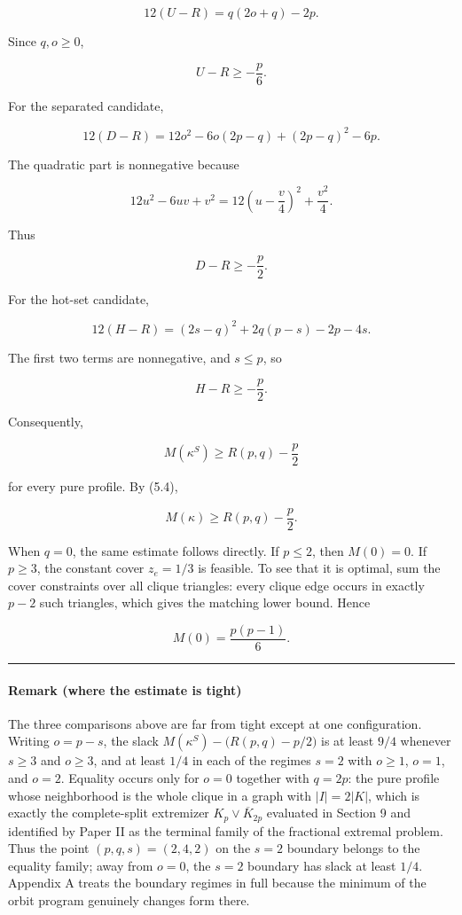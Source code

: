 \documentclass[
  american,
  11pt,
  a4paper,
]{article}
\begin{document}
\[
12(U-R)
=
q(2o+q)-2p.
\tag{7.2}
\]

Since \(q,o\ge0\),

\[
U-R\ge-\frac p6.
\tag{7.3}
\]

For the separated candidate,

\[
12(D-R)
=
12o^2-6o(2p-q)+(2p-q)^2-6p.
\tag{7.4}
\]

The quadratic part is nonnegative because

\[
12u^2-6uv+v^2
=
12\left(u-\frac v4\right)^2+\frac{v^2}{4}.
\]

Thus

\[
D-R\ge-\frac p2.
\tag{7.5}
\]

For the hot-set candidate,

\[
12(H-R)
=
(2s-q)^2+2q(p-s)-2p-4s.
\tag{7.6}
\]

The first two terms are nonnegative, and \(s\le p\), so

\[
H-R\ge-\frac p2.
\tag{7.7}
\]

Consequently,

\[
M(\kappa^S)
\ge
R(p,q)-\frac p2
\]

for every pure profile. By (5.4),

\[
\boxed{
M(\kappa)
\ge
R(p,q)-\frac p2.
}
\tag{7.8}
\]

When \(q=0\), the same estimate follows directly. If \(p\le2\), then \(M(0)=0\). If \(p\ge3\), the constant cover \(z_e=1/3\) is feasible. To see that it is optimal, sum the cover constraints over all clique triangles: every clique edge occurs in exactly \(p-2\) such triangles, which gives the matching lower bound. Hence

\[
M(0)=\frac{p(p-1)}6.
\]

\begin{center}\rule{0.5\linewidth}{0.5pt}\end{center}

\paragraph{Remark (where the estimate is tight)}\label{remark-where-the-estimate-is-tight}

The three comparisons above are far from tight except at one configuration. Writing \(o=p-s\), the slack \(M(\kappa^S)-\big(R(p,q)-p/2\big)\) is at least \(9/4\) whenever \(s\ge3\) and \(o\ge3\), and at least \(1/4\) in each of the regimes \(s=2\) with \(o\ge1\), \(o=1\), and \(o=2\). Equality occurs only for \(o=0\) together with \(q=2p\): the pure profile whose neighborhood is the whole clique in a graph with \(|I|=2|K|\), which is exactly the complete-split extremizer \(K_p\vee\overline K_{2p}\) evaluated in Section 9 and identified by Paper II as the terminal family of the fractional extremal problem. Thus the point \((p,q,s)=(2,4,2)\) on the \(s=2\) boundary belongs to the equality family; away from \(o=0\), the \(s=2\) boundary has slack at least \(1/4\). Appendix A treats the boundary regimes in full because the minimum of the orbit program genuinely changes form there.
\end{document}
